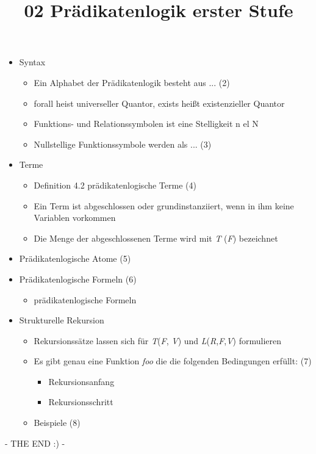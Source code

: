 \documentclass[a4paper, 12pt] {article} %
\title{02 Prädikatenlogik erster Stufe}
\begin{document}
\maketitle


\begin{itemize}
\item Syntax
\begin{itemize}
	\item Ein Alphabet der Prädikatenlogik besteht aus ... (2)
	\item forall heist universeller Quantor, exists heißt							existenzieller Quantor
	\item Funktions- und Relationssymbolen ist eine Stelligkeit n el N			\item Nullstellige Funktionssymbole werden als ... (3)
\end{itemize}
\item Terme
\begin{itemize}
	\item Definition 4.2 prädikatenlogische Terme (4)
	\item Ein Term ist abgeschlossen oder grundinstanziiert, wenn in ihm 			keine Variablen vorkommen
	\item Die Menge der abgeschlossenen Terme wird mit \textit{T}						(\textit{F}) bezeichnet
\end{itemize}
\item Prädikatenlogische Atome (5)
\item Prädikatenlogische Formeln (6)
\begin{itemize}
	\item prädikatenlogische Formeln
\end{itemize}
\item Strukturelle Rekursion 
\begin{itemize}
	\item Rekursionssätze lassen sich für \textit{T}(\textit{F},					\textit{V}) und \textit{L}(\textit{R},\textit{F},\textit{V}) 				formulieren 
	\item Es gibt genau eine Funktion \textit{foo} die die folgenden Bedingungen 				erfüllt: (7)
	\begin{itemize}
		\item Rekursionsanfang
		\item Rekursionsschritt
	\end{itemize}
	\item Beispiele (8)
	
\end{itemize}

\end{itemize}



- THE END  :) - 

\begin{lstlisting}

\end{lstlisting}
\end{document}
